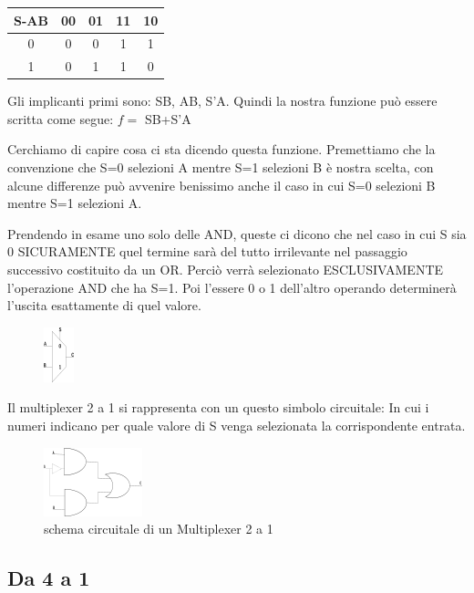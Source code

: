 \documentclass[a4paper]{book}
\begin{document}
\begin{tabular}{|c|c|c|c|c|}
\hline
S-AB & 00 & 01 & 11 & 10 \\ \hline
0 &    0  &  0 & \cellcolor{yellow}1  & \cellcolor{yellow}1  \\ \hline  
1 &    0  &  \cellcolor{yellow}1 & \cellcolor{yellow}1  & 0  \\
\hline
\end{tabular}\break


Gli implicanti primi sono: SB, AB, S'A.
Quindi la nostra funzione può essere scritta come segue:
\( f=\) SB+S'A

Cerchiamo di capire cosa ci sta dicendo questa funzione.
Premettiamo che la convenzione che S=0 selezioni A mentre S=1 selezioni B è nostra scelta, con alcune differenze può avvenire benissimo anche il caso in cui S=0 selezioni B mentre S=1 selezioni A.

Prendendo in esame uno solo delle AND, queste ci dicono che nel caso in cui S sia 0 SICURAMENTE quel termine sarà del tutto irrilevante nel passaggio successivo costituito da un OR.
Perciò verrà selezionato ESCLUSIVAMENTE l'operazione AND che ha S=1.
Poi l'essere 0 o 1 dell'altro operando determinerà l'uscita esattamente di quel valore.



\begin{figure}
\includegraphics{Multiplexer21}
\end{figure}


Il multiplexer 2 a 1 si rappresenta con un questo simbolo circuitale:
In cui i numeri indicano per quale valore di S venga selezionata la corrispondente entrata.

\begin{figure}
\centering
\includegraphics{Multiplexer21Circuito}
\caption{schema circuitale di un Multiplexer 2 a 1}
\end{figure}


\subsection{Da 4 a 1}
\end{document}
